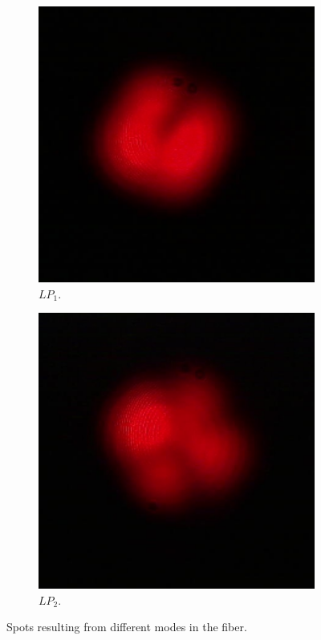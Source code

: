 \documentclass[a4paper, 12pt]{paper}
\begin{document}
\begin{figure}[H]
\begin{subfigure}[t]{0.3\textwidth}
        \includegraphics[width=\textwidth]{img/mode_3}
        \caption{$LP_{1}$.}
    \end{subfigure}
    \begin{subfigure}[t]{0.3\textwidth}
        \includegraphics[width=\textwidth]{img/mode_1}
        \caption{$LP_{2}$.}
\label{fig:mode_1}
    \end{subfigure}
    \caption{Spots resulting from different modes in the fiber.}
\label{fig:modes}
\end{figure}
\end{document}
